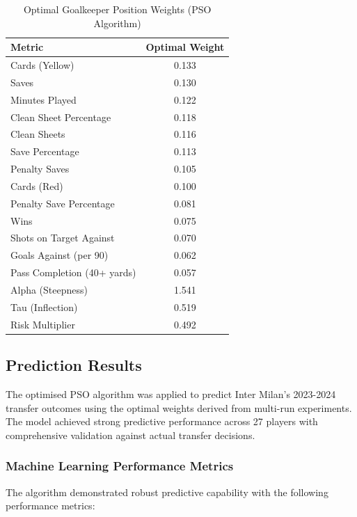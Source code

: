 \begin{table}[H]
\centering
\caption{Optimal Goalkeeper Position Weights (PSO Algorithm)}
\label{tab:goalkeeper_weights}
\begin{tabular}{lc}
\toprule
\textbf{Metric} & \textbf{Optimal Weight} \\
\midrule
Cards (Yellow) & 0.133 \\
Saves & 0.130 \\
Minutes Played & 0.122 \\
Clean Sheet Percentage & 0.118 \\
Clean Sheets & 0.116 \\
Save Percentage & 0.113 \\
Penalty Saves & 0.105 \\
Cards (Red) & 0.100 \\
Penalty Save Percentage & 0.081 \\
Wins & 0.075 \\
Shots on Target Against & 0.070 \\
Goals Against (per 90) & 0.062 \\
Pass Completion (40+ yards) & 0.057 \\
\midrule
Alpha (Steepness) & 1.541 \\
Tau (Inflection) & 0.519 \\
Risk Multiplier & 0.492 \\
\bottomrule
\end{tabular}
\end{table}

\subsection{Prediction Results}

The optimised PSO algorithm was applied to predict Inter Milan's 2023-2024 transfer outcomes using the optimal weights derived from multi-run experiments. The model achieved strong predictive performance across 27 players with comprehensive validation against actual transfer decisions.

\subsubsection{Machine Learning Performance Metrics}

The algorithm demonstrated robust predictive capability with the following performance metrics:

